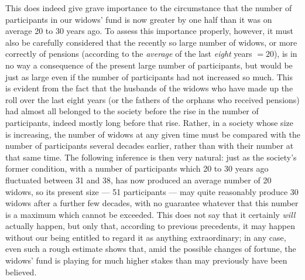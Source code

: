 This does indeed give grave importance to the circumstance that the number of participants in our widows' fund is now greater by one half than it was on average 20 to 30 years ago. To assess this importance properly, however, it must also be carefully considered that the recently so large number of widows, or more correctly of pensions (according to the \textit{average} of the last \textit{eight} years \(=20\)), is in no way a consequence of the present large number of participants, but would be just as large even if the number of participants had not increased so much. This is evident from the fact that the husbands of the widows who have made up the roll over the last eight years (or the fathers of the orphans who received pensions) had almost all belonged to the society before the rise in the number of participants, indeed mostly long before that rise. Rather, in a society whose size is increasing, the number of widows at any given time must be compared with the number of participants several decades earlier, rather than with their number at that same time. The following inference is then very natural: just as the society's former condition, with a number of participants which 20 to 30 years ago fluctuated between 31 and 38, has now produced an average number of 20 widows, so its present size — 51 participants — may quite reasonably produce 30 widows after a further few decades, with no guarantee whatever that this number is a maximum which cannot be exceeded. This does not say that it certainly \textit{will} actually happen, but only that, according to previous precedents, it may happen without our being entitled to regard it as anything extraordinary; in any case, even such a rough estimate shows that, amid the possible changes of fortune, the widows' fund is playing for much higher stakes than may previously have been believed.
